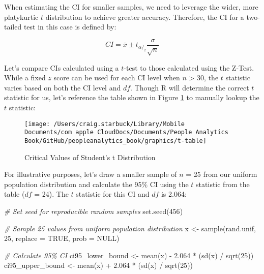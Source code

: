 \documentclass[
]{book}
\newenvironment{Shaded}{\begin{snugshade}}{\end{snugshade}}
\newcommand{\AttributeTok}[1]{\textcolor[rgb]{0.77,0.63,0.00}{#1}}
\newcommand{\CommentTok}[1]{\textcolor[rgb]{0.56,0.35,0.01}{\textit{#1}}}
\newcommand{\ConstantTok}[1]{\textcolor[rgb]{0.00,0.00,0.00}{#1}}
\newcommand{\DecValTok}[1]{\textcolor[rgb]{0.00,0.00,0.81}{#1}}
\newcommand{\FloatTok}[1]{\textcolor[rgb]{0.00,0.00,0.81}{#1}}
\newcommand{\FunctionTok}[1]{\textcolor[rgb]{0.00,0.00,0.00}{#1}}
\newcommand{\NormalTok}[1]{#1}
\newcommand{\OtherTok}[1]{\textcolor[rgb]{0.56,0.35,0.01}{#1}}
\newcommand{\SpecialCharTok}[1]{\textcolor[rgb]{0.00,0.00,0.00}{#1}}
\begin{document}
When estimating the CI for smaller samples, we need to leverage the wider, more platykurtic \(t\) distribution to achieve greater accuracy. Therefore, the CI for a two-tailed test in this case is defined by:

\[ CI = \bar{x} \pm t_{\alpha/_2} \frac{\sigma}{\sqrt{n}} \]

Let's compare CIs calculated using a \(t\)-test to those calculated using the Z-Test. While a fixed \(z\) score can be used for each CI level when \(n\) \textgreater{} 30, the \(t\) statistic varies based on both the CI level and \(df\). Though R will determine the correct \(t\) statistic for us, let's reference the table shown in Figure \ref{fig:t-crit} to manually lookup the \(t\) statistic:

\begin{figure}

{\centering \texttt{[image: /Users/craig.starbuck/Library/Mobile Documents/com~apple~CloudDocs/Documents/People Analytics Book/GitHub/peopleanalytics\_book/graphics/t-table]} 

}

\caption{Critical Values of Student's t Distribution}\label{fig:t-crit}
\end{figure}

For illustrative purposes, let's draw a smaller sample of \(n\) = 25 from our uniform population distribution and calculate the 95\% CI using the \(t\) statistic from the table (\(df\) = 24). The \(t\) statistic for this CI and \(df\) is 2.064:

\begin{Shaded}
\begin{Highlighting}[]
\CommentTok{\# Set seed for reproducible random samples}
\FunctionTok{set.seed}\NormalTok{(}\DecValTok{456}\NormalTok{)}

\CommentTok{\# Sample 25 values from uniform population distribution}
\NormalTok{x }\OtherTok{\textless{}{-}} \FunctionTok{sample}\NormalTok{(rand.unif, }\DecValTok{25}\NormalTok{, }\AttributeTok{replace =} \ConstantTok{TRUE}\NormalTok{, }\AttributeTok{prob =} \ConstantTok{NULL}\NormalTok{)}

\CommentTok{\# Calculate 95\% CI}
\NormalTok{ci95\_lower\_bound }\OtherTok{\textless{}{-}} \FunctionTok{mean}\NormalTok{(x) }\SpecialCharTok{{-}} \FloatTok{2.064} \SpecialCharTok{*}\NormalTok{ (}\FunctionTok{sd}\NormalTok{(x) }\SpecialCharTok{/} \FunctionTok{sqrt}\NormalTok{(}\DecValTok{25}\NormalTok{))}
\NormalTok{ci95\_upper\_bound }\OtherTok{\textless{}{-}} \FunctionTok{mean}\NormalTok{(x) }\SpecialCharTok{+} \FloatTok{2.064} \SpecialCharTok{*}\NormalTok{ (}\FunctionTok{sd}\NormalTok{(x) }\SpecialCharTok{/} \FunctionTok{sqrt}\NormalTok{(}\DecValTok{25}\NormalTok{))}
\end{Highlighting}
\end{Shaded}
\end{document}
